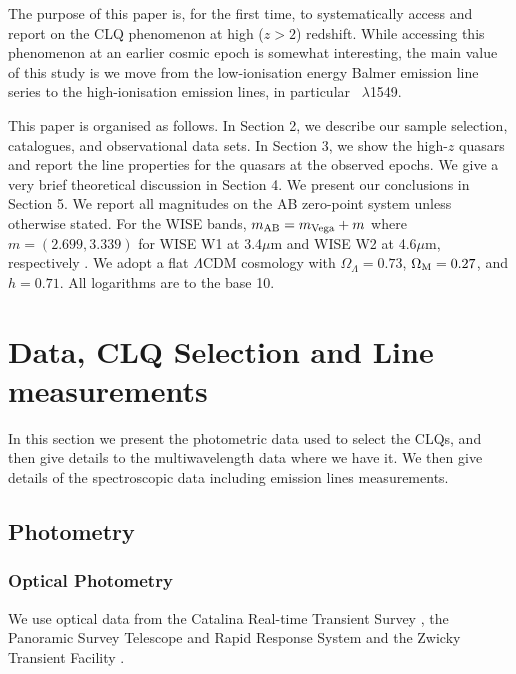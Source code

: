 \documentclass[fleqn,usenatbib]{mnras}
\begin{document}
The purpose of this paper is, for the first time, to systematically
access and report on the CLQ phenomenon at high ($z>2$)
redshift. While accessing this phenomenon at an earlier cosmic epoch
is somewhat interesting, the main value of this study is we move from
the low-ionisation energy Balmer emission line series to the
high-ionisation emission lines, in particular \civ\ $\lambda$1549.

This paper is organised as follows. In Section 2, we describe our
sample selection, catalogues, and observational data sets.  In Section
3, we show the high-$z$ quasars and report the line properties for the
quasars at the observed epochs.  We give a very brief theoretical
discussion in Section 4. We present our conclusions in Section 5.  We
report all magnitudes on the AB zero-point system \citep{Oke_Gunn1983,
Fukugita1996} unless otherwise stated. For the WISE bands, $m_{\rm AB}
= m_{\rm Vega} + m$ where $m = (2.699, 3.339)$ for WISE W1 at
3.4$\mu$m and WISE W2 at 4.6$\mu$m, respectively \citep{Cutri2011,
Cutri2013}. We adopt a flat $\Lambda$CDM cosmology with
$\Omega_{\Lambda} = 0.73 $, $\Omega_{\rm M} = 0.27$, and $h =
0.71$. All logarithms are to the base 10.


\section{Data, CLQ Selection and Line measurements}
In this section we present the photometric data used to select the
CLQs, and then give details to the multiwavelength data where we have
it. We then give details of the spectroscopic data including emission
lines measurements.

\subsection{Photometry}
\subsubsection{Optical Photometry}
We use optical data from the Catalina Real-time Transient Survey
\citep[CRTS;][]{Drake2009, Mahabal2011}, the Panoramic Survey
Telescope and Rapid Response System \citep[PanSTARRS;][]{Kaiser2010,
Stubbs2010, Tonry2012, Magnier2013} and the Zwicky Transient Facility
\citep[ZTF;][]{Bellm2019_ZTFOverview}. 
\end{document}
